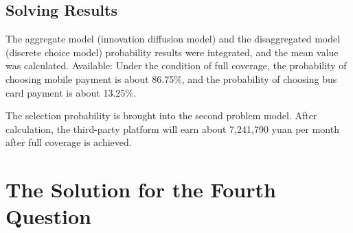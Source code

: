 \documentclass[../mcmpaper]{subfiles}
\begin{document}
\subsection{Solving Results}
The aggregate model (innovation diffusion model) and the disaggregated model (discrete choice model) probability results were integrated, and the mean value was calculated. Available: Under the condition of full coverage, the probability of choosing mobile payment is about 86.75\%, and the probability of choosing bus card payment is about 13.25\%.
\par
The selection probability is brought into the second problem model. After calculation, the third-party platform will earn about 7,241,790 yuan per month after full coverage is achieved.
\section{The Solution for the Fourth Question}
\end{document}
